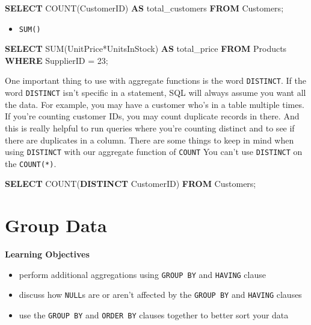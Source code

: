 \documentclass[]{book}
\newenvironment{Shaded}{\begin{snugshade}}{\end{snugshade}}
\newcommand{\KeywordTok}[1]{\textcolor[rgb]{0.13,0.29,0.53}{\textbf{{#1}}}}
\newcommand{\DecValTok}[1]{\textcolor[rgb]{0.00,0.00,0.81}{{#1}}}
\newcommand{\FunctionTok}[1]{\textcolor[rgb]{0.00,0.00,0.00}{{#1}}}
\newcommand{\NormalTok}[1]{{#1}}
\providecommand{\tightlist}{%
  \setlength{\itemsep}{0pt}\setlength{\parskip}{0pt}}
\theoremstyle{definition}
\theoremstyle{definition}
\theoremstyle{remark}
\begin{document}
\begin{Shaded}
\begin{Highlighting}[]
\KeywordTok{SELECT} \FunctionTok{COUNT}\NormalTok{(CustomerID) }\KeywordTok{AS} \NormalTok{total_customers}
\KeywordTok{FROM} \NormalTok{Customers;}
\end{Highlighting}
\end{Shaded}

\begin{itemize}
\tightlist
\item
  \texttt{SUM()}
\end{itemize}

\begin{Shaded}
\begin{Highlighting}[]
\KeywordTok{SELECT} \FunctionTok{SUM}\NormalTok{(UnitPrice*UnitsInStock) }\KeywordTok{AS} \NormalTok{total_price}
\KeywordTok{FROM} \NormalTok{Products}
\KeywordTok{WHERE} \NormalTok{SupplierID = }\DecValTok{23}\NormalTok{;}
\end{Highlighting}
\end{Shaded}

One important thing to use with aggregate functions is the word
\texttt{DISTINCT}. If the word \texttt{DISTINCT} isn't specific in a
statement, SQL will always assume you want all the data. For example,
you may have a customer who's in a table multiple times. If you're
counting customer IDs, you may count duplicate records in there. And
this is really helpful to run queries where you're counting distinct and
to see if there are duplicates in a column. There are some things to
keep in mind when using \texttt{DISTINCT} with our aggregate function of
\texttt{COUNT} You can't use \texttt{DISTINCT} on the \texttt{COUNT(*)}.

\begin{Shaded}
\begin{Highlighting}[]
\KeywordTok{SELECT} \FunctionTok{COUNT}\NormalTok{(}\KeywordTok{DISTINCT} \NormalTok{CustomerID)}
\KeywordTok{FROM} \NormalTok{Customers;}
\end{Highlighting}
\end{Shaded}

\section{Group Data}\label{group-data}

\textbf{Learning Objectives}

\begin{itemize}
\tightlist
\item
  perform additional aggregations using \texttt{GROUP\ BY} and
  \texttt{HAVING} clause
\item
  discuss how \texttt{NULL}s are or aren't affected by the
  \texttt{GROUP\ BY} and \texttt{HAVING} clauses
\item
  use the \texttt{GROUP\ BY} and \texttt{ORDER\ BY} clauses together to
  better sort your data
\end{itemize}
\end{document}
